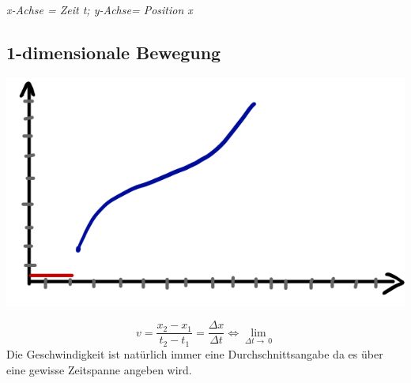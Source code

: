 \documentclass[11pt]{article}
\begin{document}
\begin{center}
  	\textit{x-Achse = Zeit t; y-Achse= Position x}
  	\end{center}
 \subsection{1-dimensionale Bewegung}
 	\begin{center}
 			\includegraphics[scale=0.3]{20190411_073844099_iOS.png}
 	\end{center}
 \[ v = \frac{x_2 - x_1}{t_2 - t_1} = \frac{\Delta x}{\Delta t} \Leftrightarrow \lim_{\Delta t\to\ 0} \]
 Die Geschwindigkeit ist natürlich immer eine Durchschnittsangabe da es über eine gewisse Zeitspanne angeben wird. 
 
 \newpage
\end{document}
